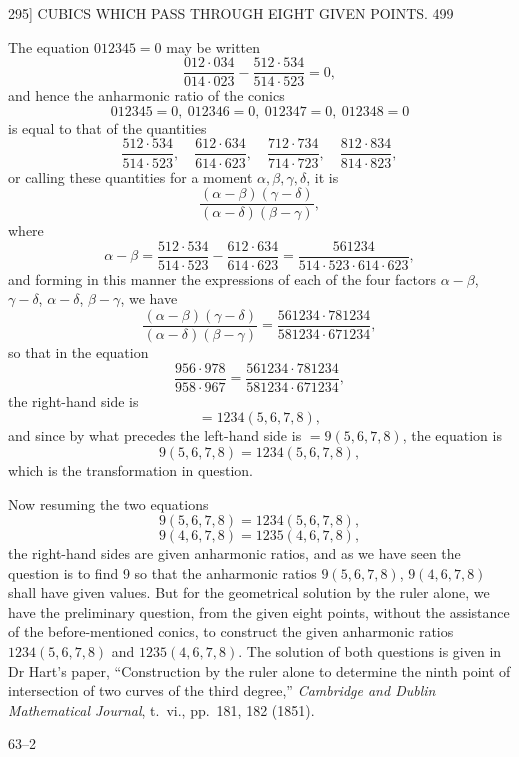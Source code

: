 \documentclass[11pt]{article}
\begin{document}
\newpage
\begin{center}
\textsc{295]} \hfill CUBICS WHICH PASS THROUGH EIGHT GIVEN POINTS. \hfill 499
\end{center}

The equation $012345=0$ may be written
\[ \dfrac{012\cdot 034}{014\cdot 023}-\dfrac{512\cdot 534}{514\cdot 523} = 0, \]
and hence the anharmonic ratio of the conics
\[ 012345=0,\ 012346=0,\ 012347=0,\ 012348=0 \]
is equal to that of the quantities
\[ \dfrac{512\cdot 534}{514\cdot 523},\quad \dfrac{612\cdot 634}{614\cdot 623},\quad \dfrac{712\cdot 734}{714\cdot 723},\quad \dfrac{812\cdot 834}{814\cdot 823}, \]
or calling these quantities for a moment $\alpha,\beta,\gamma,\delta$, it is
\[ \dfrac{(\alpha-\beta)(\gamma-\delta)}{(\alpha-\delta)(\beta-\gamma)}, \]
where
\[ \alpha-\beta = \dfrac{512\cdot 534}{514\cdot 523}-\dfrac{612\cdot 634}{614\cdot 623} = \dfrac{561234}{514\cdot 523\cdot 614\cdot 623}, \]
and forming in this manner the expressions of each of the four factors $\alpha-\beta$, $\gamma-\delta$,
$\alpha-\delta$, $\beta-\gamma$, we have
\[ \dfrac{(\alpha-\beta)(\gamma-\delta)}{(\alpha-\delta)(\beta-\gamma)} = \dfrac{561234\cdot 781234}{581234\cdot 671234}, \]
so that in the equation
\[ \dfrac{956\cdot 978}{958\cdot 967} = \dfrac{561234\cdot 781234}{581234\cdot 671234}, \]
the right-hand side is
\[ = 1234(5,6,7,8), \]
and since by what precedes the left-hand side is $=9(5,6,7,8)$, the equation is
\[ 9(5,6,7,8) = 1234(5,6,7,8), \]
which is the transformation in question.

Now resuming the two equations
\[ 9(5,6,7,8) = 1234(5,6,7,8), \]
\[ 9(4,6,7,8) = 1235(4,6,7,8), \]
the right-hand sides are given anharmonic ratios, and as we have seen the question
is to find 9 so that the anharmonic ratios $9(5,6,7,8)$, $9(4,6,7,8)$ shall have given
values. But for the geometrical solution by the ruler alone, we have the preliminary
question, from the given eight points, without the assistance of the before-mentioned
conics, to construct the given anharmonic ratios $1234(5,6,7,8)$ and $1235(4,6,7,8)$.
The solution of both questions is given in Dr Hart's paper, ``Construction by the
ruler alone to determine the ninth point of intersection of two curves of the third
degree,'' \textit{Cambridge and Dublin Mathematical Journal}, t.\ vi., pp.\ 181, 182 (1851).

\medskip
\hfill 63--2\hfill\hfill
\end{document}
